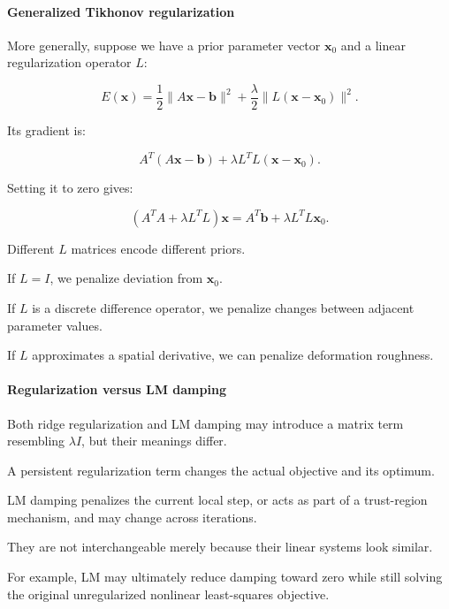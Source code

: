 \paragraph{Generalized Tikhonov regularization}\label{02-foundations-ii-ch027-generalized-tikhonov-regularization}

\hypertarget{02-foundations-ii-ch027-generalized-tikhonov-regularization}{}

More generally, suppose we have a prior parameter vector \(\mathbf x_0\) and a linear regularization operator \(L\):

\[
E(\mathbf x)= \frac12\|A\mathbf x-\mathbf b\|^2+ \frac\lambda2\|L(\mathbf x-\mathbf x_0)\|^2.
\]

Its gradient is:

\[
A^T(A\mathbf x-\mathbf b)+ \lambda L^TL(\mathbf x-\mathbf x_0).
\]

Setting it to zero gives:

\[
\boxed{ (A^TA+\lambda L^TL)\mathbf x = A^T\mathbf b+\lambda L^TL\mathbf x_0 }.
\]

Different \(L\) matrices encode different priors.

If \(L=I\), we penalize deviation from \(\mathbf x_0\).

If \(L\) is a discrete difference operator, we penalize changes between adjacent parameter values.

If \(L\) approximates a spatial derivative, we can penalize deformation roughness.

\paragraph{Regularization versus LM damping}\label{02-foundations-ii-ch027-regularization-versus-lm-damping}

\hypertarget{02-foundations-ii-ch027-regularization-versus-lm-damping}{}

Both ridge regularization and LM damping may introduce a matrix term resembling \(\lambda I\), but their meanings differ.

A persistent regularization term changes the actual objective and its optimum.

LM damping penalizes the current local step, or acts as part of a trust-region mechanism, and may change across iterations.

They are not interchangeable merely because their linear systems look similar.

For example, LM may ultimately reduce damping toward zero while still solving the original unregularized nonlinear least-squares objective.

